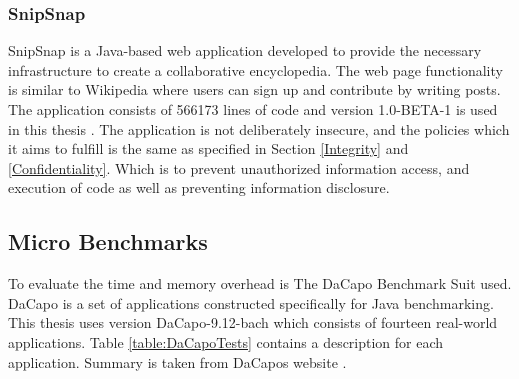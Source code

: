 \subsubsection{SnipSnap}
SnipSnap is a Java-based web application developed to provide the necessary infrastructure to create a collaborative encyclopedia. The web page functionality is similar to Wikipedia \parencite{wikipedia} where users can sign up and contribute by writing posts. The application consists of 566173 lines of code and version 1.0-BETA-1 is used in this thesis \parencite{snipsnap}. The application is not deliberately insecure, and the policies which it aims to fulfill is the same as specified in Section \ref{Integrity} and \ref{Confidentiality}. Which is to prevent unauthorized information access, and execution of code as well as preventing information disclosure.



\subsection{Micro Benchmarks}
To evaluate the time and memory overhead is The DaCapo Benchmark Suit \parencite{dacapo} used. DaCapo is a set of applications constructed specifically for Java benchmarking. This thesis uses version DaCapo-9.12-bach which consists of fourteen real-world applications. Table \ref{table:DaCapoTests} contains a description for each application. Summary is taken from DaCapos website \parencite{dacapoBench}.

